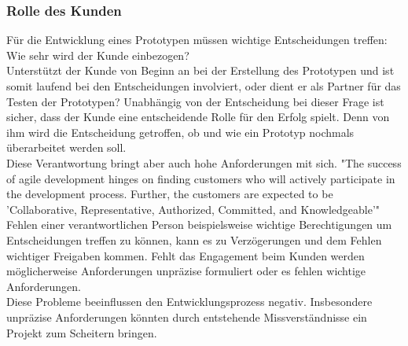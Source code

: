 \documentclass[a4paper,12pt,top=2.5cm,bottom=2.5cm, left=2.5cm, right=2.5cm, numbers=noenddot]{scrartcl}
\begin{document}
\subsubsection{Rolle des Kunden}
Für die Entwicklung eines Prototypen müssen wichtige Entscheidungen treffen: Wie sehr wird der Kunde einbezogen?
\\Unterstützt der Kunde von Beginn an bei der Erstellung des Prototypen und ist somit laufend bei den Entscheidungen involviert, oder dient er als Partner für das Testen der Prototypen? 
Unabhängig von der Entscheidung bei dieser Frage ist sicher, dass der Kunde eine entscheidende Rolle für den Erfolg spielt. Denn von ihm wird die Entscheidung getroffen, ob und wie ein Prototyp nochmals überarbeitet werden soll. \\
Diese Verantwortung bringt aber auch hohe Anforderungen mit sich. 
"The success of agile development hinges on finding customers who will actively participate in the development process. Further, the customers are expected to be 'Collaborative, Representative, Authorized, Committed, and Knowledgeable'" \cite{10.1145/1060710.1060712}\\
Fehlen einer verantwortlichen Person beispielsweise wichtige Berechtigungen um Entscheidungen treffen zu können, kann es zu Verzögerungen und dem Fehlen wichtiger Freigaben kommen. Fehlt das Engagement beim Kunden werden möglicherweise Anforderungen unpräzise formuliert oder es fehlen wichtige Anforderungen. \\
Diese Probleme beeinflussen den Entwicklungsprozess negativ. Insbesondere unpräzise Anforderungen könnten durch entstehende Missverständnisse ein Projekt zum Scheitern bringen.\cite{article} %
\end{document}
